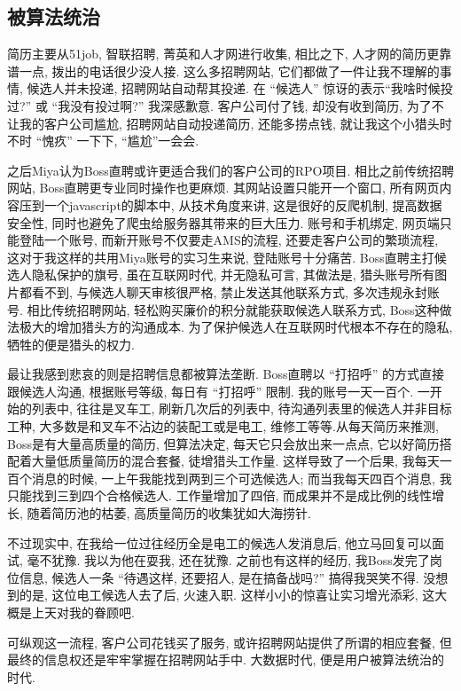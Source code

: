 \subsection{被算法统治}
简历主要从51job, 智联招聘, 菁英和人才网进行收集, 相比之下, 人才网的简历更靠谱一点, 拨出的电话很少没人接. 这么多招聘网站, 它们都做了一件让我不理解的事情, 候选人并未投递, 招聘网站自动帮其投递. 在 ``候选人'' 惊讶的表示``我啥时候投过?'' 或 ``我没有投过啊?'' 我深感歉意. 客户公司付了钱, 却没有收到简历, 为了不让我的客户公司尴尬, 招聘网站自动投递简历, 还能多捞点钱, 就让我这个小猎头时不时 ``愧疚'' 一下下, ``尴尬''一会会. 

之后Miya认为Boss直聘或许更适合我们的客户公司的RPO项目. 相比之前传统招聘网站, Boss直聘更专业同时操作也更麻烦. 其网站设置只能开一个窗口, 所有网页内容压到一个javascript的脚本中, 从技术角度来讲, 这是很好的反爬机制, 提高数据安全性, 同时也避免了爬虫给服务器其带来的巨大压力. 账号和手机绑定, 网页端只能登陆一个账号, 而新开账号不仅要走AMS的流程, 还要走客户公司的繁琐流程, 这对于我这样的共用Miya账号的实习生来说, 登陆账号十分痛苦. Boss直聘主打候选人隐私保护的旗号, 虽在互联网时代, 并无隐私可言, 其做法是, 猎头账号所有图片都看不到, 与候选人聊天审核很严格, 禁止发送其他联系方式, 多次违规永封账号. 相比传统招聘网站, 轻松购买廉价的积分就能获取候选人联系方式, Boss这种做法极大的增加猎头方的沟通成本. 为了保护候选人在互联网时代根本不存在的隐私, 牺牲的便是猎头的权力. 

最让我感到悲哀的则是招聘信息都被算法垄断. Boss直聘以 ``打招呼'' 的方式直接跟候选人沟通, 根据账号等级, 每日有 ``打招呼'' 限制. 我的账号一天一百个. 一开始的列表中, 往往是叉车工, 刷新几次后的列表中, 待沟通列表里的候选人并非目标工种, 大多数是和叉车不沾边的装配工或是电工, 维修工等等.从每天简历来推测, Boss是有大量高质量的简历, 但算法决定, 每天它只会放出来一点点, 它以好简历搭配着大量低质量简历的混合套餐, 徒增猎头工作量. 这样导致了一个后果, 我每天一百个消息的时候, 一上午我能找到两到三个可选候选人; 而当我每天四百个消息, 我只能找到三到四个合格候选人. 工作量增加了四倍, 而成果并不是成比例的线性增长, 随着简历池的枯萎, 高质量简历的收集犹如大海捞针. 

不过现实中, 在我给一位过往经历全是电工的候选人发消息后, 他立马回复可以面试, 毫不犹豫. 我以为他在耍我, 还在犹豫. 之前也有这样的经历, 我Boss发完了岗位信息, 候选人一条 ``待遇这样, 还要招人, 是在搞备战吗?'' 搞得我哭笑不得. 没想到的是, 这位电工候选人去了后, 火速入职. 这样小小的惊喜让实习增光添彩, 这大概是上天对我的眷顾吧. 

可纵观这一流程, 客户公司花钱买了服务, 或许招聘网站提供了所谓的相应套餐, 但最终的信息权还是牢牢掌握在招聘网站手中. 大数据时代, 便是用户被算法统治的时代.

